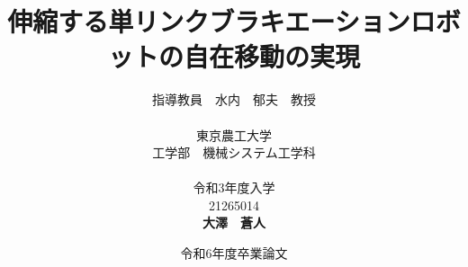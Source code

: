 


\usepackage{ikuo}%



\usepackage[dvipdfmx]{hyperref}  %
\usepackage{pxjahyper} %
\hypersetup{colorlinks=true}
\hypersetup{linkcolor=black}
\hypersetup{urlcolor=black}
\hypersetup{citecolor=black}

\usepackage{url} %

\newcommand{\FIGDIR}{./fig}        %


\date{令和6年度卒業論文}
\title{伸縮する単リンクブラキエーションロボットの自在移動の実現}
\author{指導教員　水内　郁夫　教授 \\
\ \\
東京農工大学　\\
工学部　機械システム工学科　\\
\ \\
令和3年度入学\\
21265014\\
{\bf 大澤　蒼人}}


\setlength{\baselineskip}{20pt}
\maketitle
\tableofcontents
















